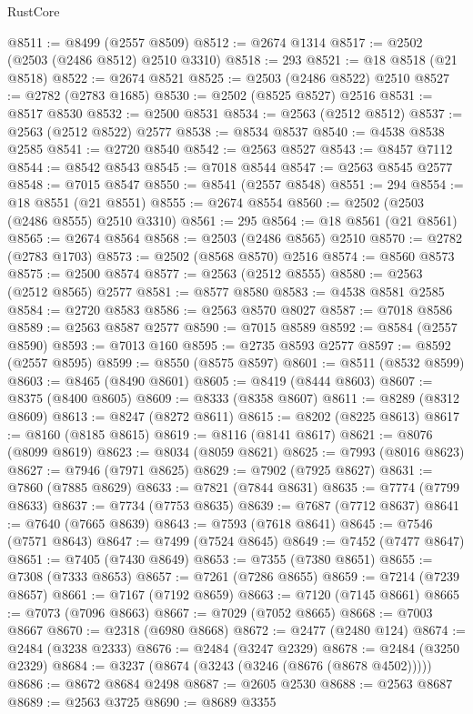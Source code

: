 \begin{lexlean}{RustCore}
\begin{coremodule}
@8511 := @8499 (@2557 @8509)
@8512 := @2674 @1314
@8517 := @2502 (@2503 (@2486 @8512) @2510 @3310)
@8518 := 293
@8521 := @18 @8518 (@21 @8518)
@8522 := @2674 @8521
@8525 := @2503 (@2486 @8522) @2510
@8527 := @2782 (@2783 @1685)
@8530 := @2502 (@8525 @8527) @2516
@8531 := @8517 @8530
@8532 := @2500 @8531
@8534 := @2563 (@2512 @8512)
@8537 := @2563 (@2512 @8522) @2577
@8538 := @8534 @8537
@8540 := @4538 @8538 @2585
@8541 := @2720 @8540
@8542 := @2563 @8527
@8543 := @8457 @7112
@8544 := @8542 @8543
@8545 := @7018 @8544
@8547 := @2563 @8545 @2577
@8548 := @7015 @8547
@8550 := @8541 (@2557 @8548)
@8551 := 294
@8554 := @18 @8551 (@21 @8551)
@8555 := @2674 @8554
@8560 := @2502 (@2503 (@2486 @8555) @2510 @3310)
@8561 := 295
@8564 := @18 @8561 (@21 @8561)
@8565 := @2674 @8564
@8568 := @2503 (@2486 @8565) @2510
@8570 := @2782 (@2783 @1703)
@8573 := @2502 (@8568 @8570) @2516
@8574 := @8560 @8573
@8575 := @2500 @8574
@8577 := @2563 (@2512 @8555)
@8580 := @2563 (@2512 @8565) @2577
@8581 := @8577 @8580
@8583 := @4538 @8581 @2585
@8584 := @2720 @8583
@8586 := @2563 @8570 @8027
@8587 := @7018 @8586
@8589 := @2563 @8587 @2577
@8590 := @7015 @8589
@8592 := @8584 (@2557 @8590)
@8593 := @7013 @160
@8595 := @2735 @8593 @2577
@8597 := @8592 (@2557 @8595)
@8599 := @8550 (@8575 @8597)
@8601 := @8511 (@8532 @8599)
@8603 := @8465 (@8490 @8601)
@8605 := @8419 (@8444 @8603)
@8607 := @8375 (@8400 @8605)
@8609 := @8333 (@8358 @8607)
@8611 := @8289 (@8312 @8609)
@8613 := @8247 (@8272 @8611)
@8615 := @8202 (@8225 @8613)
@8617 := @8160 (@8185 @8615)
@8619 := @8116 (@8141 @8617)
@8621 := @8076 (@8099 @8619)
@8623 := @8034 (@8059 @8621)
@8625 := @7993 (@8016 @8623)
@8627 := @7946 (@7971 @8625)
@8629 := @7902 (@7925 @8627)
@8631 := @7860 (@7885 @8629)
@8633 := @7821 (@7844 @8631)
@8635 := @7774 (@7799 @8633)
@8637 := @7734 (@7753 @8635)
@8639 := @7687 (@7712 @8637)
@8641 := @7640 (@7665 @8639)
@8643 := @7593 (@7618 @8641)
@8645 := @7546 (@7571 @8643)
@8647 := @7499 (@7524 @8645)
@8649 := @7452 (@7477 @8647)
@8651 := @7405 (@7430 @8649)
@8653 := @7355 (@7380 @8651)
@8655 := @7308 (@7333 @8653)
@8657 := @7261 (@7286 @8655)
@8659 := @7214 (@7239 @8657)
@8661 := @7167 (@7192 @8659)
@8663 := @7120 (@7145 @8661)
@8665 := @7073 (@7096 @8663)
@8667 := @7029 (@7052 @8665)
@8668 := @7003 @8667
@8670 := @2318 (@6980 @8668)
@8672 := @2477 (@2480 @124)
@8674 := @2484 (@3238 @2333)
@8676 := @2484 (@3247 @2329)
@8678 := @2484 (@3250 @2329)
@8684 := @3237 (@8674 (@3243 (@3246 (@8676 (@8678 @4502)))))
@8686 := @8672 @8684 @2498
@8687 := @2605 @2530
@8688 := @2563 @8687
@8689 := @2563 @3725
@8690 := @8689 @3355

\end{coremodule}
\end{lexlean}
